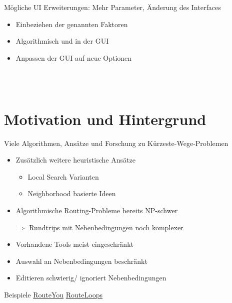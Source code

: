 \documentclass[aspectratio=169,xcolor=dvipsnames, t]{beamer}
\begin{document}
\begin{frame}
{\begin{minipage}[t][3.8cm][b]{0.48\linewidth}
{\begin{block}{Mögliche UI Erweiterungen: Mehr Parameter, Änderung des Interfaces}
\begin{itemize}
						\item<10-> Einbeziehen der genannten Faktoren
						\item<11-> Algorithmisch und in der GUI
						\item<12-> Anpassen der GUI auf neue Optionen
					\end{itemize}
				\end{block}
			\textcolor{white}{a}\\
			\textcolor{white}{a}}
			\end{minipage}}
	\end{frame}
	
	
	\section{Motivation und Hintergrund}	
	\begin{frame}
		\vspace{0.5cm}
		Viele Algorithmen, Ansätze und Forschung zu Kürzeste-Wege-Problemen
		\pause
		\begin{itemize}[<+->]
			\item Zusätzlich weitere heuristische Ansätze
			\begin{itemize}
				\item<2-> Local Search Varianten \cite{braysyVehicleRoutingProblem2005, irnichSequentialSearchIts2006, ropkeHeuristicExactAlgorithms2005}
				\item<2-> Neighborhood basierte Ideen \cite{braysyVehicleRoutingProblem2005, irnichSequentialSearchIts2006, ropkeHeuristicExactAlgorithms2005}
			\end{itemize} 
		\item Algorithmische Routing-Probleme bereits NP-schwer \cite{reineltTravelingSalesmanComputational2003}		
			\item[$\Rightarrow$] Rundtrips mit Nebenbedingungen noch komplexer \cite{gemsaEfficientComputationJogging2013}
			\item Vorhandene Tools meist eingeschränkt
			\item Auswahl an Nebenbedingungen beschränkt
			\item Editieren schwierig/ ignoriert Nebenbedingungen
		\end{itemize}
	\end{frame}
	
	\begin{frame}{Beispiele}
		\centering
		\vspace{2.5cm}
		\Huge
		\only<1> {\href{https://www.routeyou.com}{RouteYou}}
		\only<2> {\href{https://www.routeloops.com/}{RouteLoops}}
	\end{frame}
	
\end{document}
